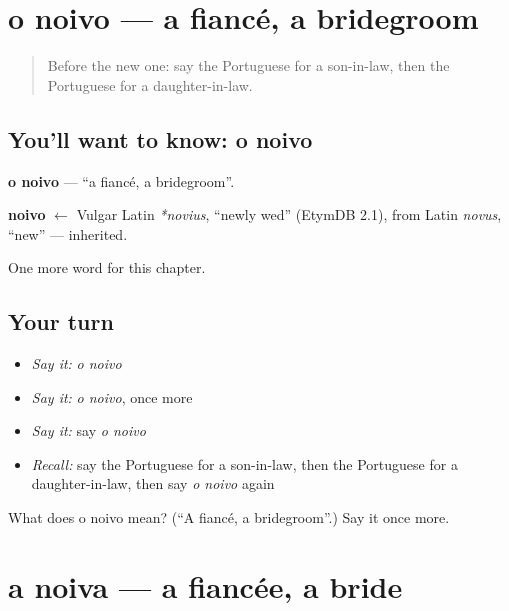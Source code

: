 \section[o noivo]{o noivo — a fiancé, a bridegroom}

\label{lesson:PT-C221-noivo}



\begin{quote}
Before the new one: say the Portuguese for a son-in-law, then the Portuguese for a daughter-in-law.
\end{quote}

\subsection*{You'll want to know: o noivo}
\textbf{o noivo} — \textquotedblleft{}a fiancé, a bridegroom\textquotedblright{}.

\begin{cousinweb}
\textbf{noivo} $\leftarrow$ Vulgar Latin \emph{*novius}, \textquotedblleft{}newly wed\textquotedblright{} (EtymDB 2.1), from Latin \emph{novus}, \textquotedblleft{}new\textquotedblright{} — inherited.
\end{cousinweb}

\begin{grammarlens}[title={What you've built}]
One more word for this chapter.
\end{grammarlens}

\subsection*{Your turn}
\begin{itemize}
\raggedright
  \item \emph{Say it:} \emph{o noivo}
  \item \emph{Say it:} \emph{o noivo}, once more
  \item \emph{Say it:} say \emph{o noivo}
  \item \emph{Recall:} say the Portuguese for a son-in-law, then the Portuguese for a daughter-in-law, then say \emph{o noivo} again
\end{itemize}

\begin{tcolorbox}[breakable,colback=teal!4,colframe=teal!35!black,title={Before you move on}]
What does o noivo mean? (\textquotedblleft{}A fiancé, a bridegroom\textquotedblright{}.) Say it once more.
\end{tcolorbox}
\section[a noiva]{a noiva — a fiancée, a bride}


